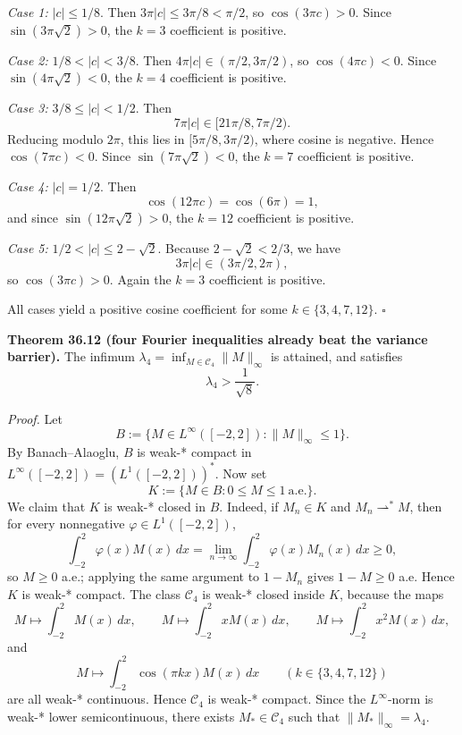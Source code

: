 \smallskip
\emph{Case 1:} \(|c|\le 1/8\).
Then \(3\pi|c|\le 3\pi/8<\pi/2\), so \(\cos(3\pi c)>0\).
Since \(\sin(3\pi\sqrt 2)>0\), the \(k=3\) coefficient is positive.

\smallskip
\emph{Case 2:} \(1/8<|c|<3/8\).
Then \(4\pi|c|\in(\pi/2,3\pi/2)\), so \(\cos(4\pi c)<0\).
Since \(\sin(4\pi\sqrt 2)<0\), the \(k=4\) coefficient is positive.

\smallskip
\emph{Case 3:} \(3/8\le |c|<1/2\).
Then
\[
 7\pi|c|\in[21\pi/8,7\pi/2).
\]
Reducing modulo \(2\pi\), this lies in
\([5\pi/8,3\pi/2)\), where cosine is negative.
Hence \(\cos(7\pi c)<0\).
Since \(\sin(7\pi\sqrt 2)<0\), the \(k=7\) coefficient is positive.

\smallskip
\emph{Case 4:} \(|c|=1/2\).
Then
\[
 \cos(12\pi c)=\cos(6\pi)=1,
\]
and since \(\sin(12\pi\sqrt 2)>0\), the \(k=12\) coefficient is positive.

\smallskip
\emph{Case 5:} \(1/2<|c|\le 2-\sqrt 2\).
Because \(2-\sqrt 2<2/3\), we have
\[
 3\pi|c|\in(3\pi/2,2\pi),
\]
so \(\cos(3\pi c)>0\).
Again the \(k=3\) coefficient is positive.

All cases yield a positive cosine coefficient for some \(k\in\{3,4,7,12\}\).
\hfill$\square$

\medskip
\noindent\textbf{Theorem 36.12 (four Fourier inequalities already beat the variance barrier).}
The infimum \(\lambda_4=\inf_{M\in\mathcal C_4}\|M\|_\infty\) is attained, and satisfies
\[
 \lambda_4>\frac{1}{\sqrt 8}.
\]

\noindent\emph{Proof.}
Let
\[
 B:=\{M\in L^\infty([-2,2]): \|M\|_\infty\le 1\}.
\]
By Banach--Alaoglu, \(B\) is weak-* compact in \(L^\infty([-2,2])=(L^1([-2,2]))^*\).
Now set
\[
 K:=\{M\in B: 0\le M\le 1\ \text{a.e.}\}.
\]
We claim that \(K\) is weak-* closed in \(B\).
Indeed, if \(M_n\in K\) and \(M_n\rightharpoonup^* M\), then for every nonnegative \(\varphi\in L^1([-2,2])\),
\[
 \int_{-2}^{2}\varphi(x)M(x)\,dx=\lim_{n\to\infty}\int_{-2}^{2}\varphi(x)M_n(x)\,dx\ge 0,
\]
so \(M\ge 0\) a.e.; applying the same argument to \(1-M_n\) gives \(1-M\ge 0\) a.e.
Hence \(K\) is weak-* compact.
The class \(\mathcal C_4\) is weak-* closed inside \(K\), because the maps
\[
 M\mapsto \int_{-2}^{2}M(x)\,dx,
 \qquad
 M\mapsto \int_{-2}^{2}xM(x)\,dx,
 \qquad
 M\mapsto \int_{-2}^{2}x^2M(x)\,dx,
\]
and
\[
 M\mapsto \int_{-2}^{2}\cos(\pi kx)M(x)\,dx
 \qquad (k\in\{3,4,7,12\})
\]
are all weak-* continuous.
Hence \(\mathcal C_4\) is weak-* compact.
Since the \(L^\infty\)-norm is weak-* lower semicontinuous, there exists
\(M_*\in\mathcal C_4\) such that
\(
 \|M_*\|_\infty=\lambda_4
\).

